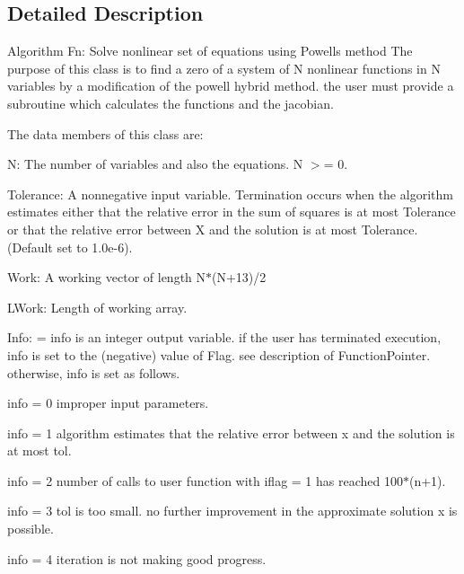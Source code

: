 \subsection{Detailed Description}
Algorithm Fn\+: Solve nonlinear set of equations using Powell\textquotesingle{}s method The purpose of this class is to find a zero of a system of N nonlinear functions in N variables by a modification of the powell hybrid method. the user must provide a subroutine which calculates the functions and the jacobian.

The data members of this class are\+:


\begin{DoxyItemize}
\item N\+: The number of variables and also the equations. N $>$= 0.
\item Tolerance\+: A nonnegative input variable. Termination occurs when the algorithm estimates either that the relative error in the sum of squares is at most Tolerance or that the relative error between X and the solution is at most Tolerance. (Default set to 1.\+0e-\/6).
\item Work\+: A working vector of length N$\ast$(N+13)/2
\item L\+Work\+: Length of working array.
\item Info\+: = info is an integer output variable. if the user has terminated execution, info is set to the (negative) value of Flag. see description of Function\+Pointer. otherwise, info is set as follows.

info = 0 improper input parameters.

info = 1 algorithm estimates that the relative error between x and the solution is at most tol.

info = 2 number of calls to user function with iflag = 1 has reached 100$\ast$(n+1).

info = 3 tol is too small. no further improvement in the approximate solution x is possible.

info = 4 iteration is not making good progress.
\end{DoxyItemize}

